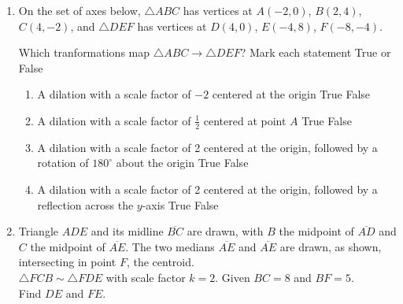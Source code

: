 \documentclass[12pt, twoside]{article}
\begin{document}
\begin{enumerate}
\item On the set of axes below, $\triangle ABC$ has vertices at $A(-2,0)$, $B(2,4)$, $C(4,-2)$, and $\triangle DEF$ has vertices at $D(4,0)$, $E(-4,8)$, $F(-8,-4)$.
\begin{center}
\end{center}
Which tranformations map $\triangle ABC \rightarrow \triangle DEF$? Mark each statement True or False
  \begin{enumerate}
    \item A dilation with a scale factor of $-2$ centered at the origin \hfill True \quad False
    \item A dilation with a scale factor of $\frac{1}{2}$ centered at point $A$ \hfill True \quad False
    \item A dilation with a scale factor of 2 centered at the origin, followed by a rotation of $180^\circ$ about the origin \hfill True \quad False
    \item A dilation with a scale factor of 2 centered at the origin, followed by a reflection across the $y$-axis \hfill True \quad False
  \end{enumerate}

\newpage
\item Triangle $ADE$ and its midline $\overline{BC}$ are drawn, with $B$ the midpoint of $\overline{AD}$ and $C$ the midpoint of $\overline{AE}$. The two medians $\overline{AE}$ and $\overline{AE}$ are drawn, as shown, intersecting in point $F$, the centroid.\\[0.25cm]
$\triangle FCB \sim \triangle FDE$ with scale factor $k=2$. 
Given $BC=8$ and $BF=5$. \\[0.25cm] Find $DE$ and $FE$.
\begin{flushright}
  \end{flushright}


\end{enumerate}
\end{document}
